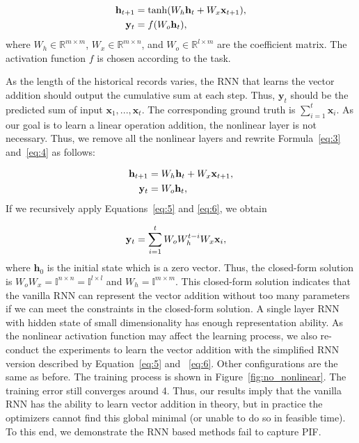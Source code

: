 \documentclass[sigconf]{acmart}
\begin{document}
\begin{align}
\small
\label{eq:3}
\mathbf{h}_{t+1} & = \tanh(W_h\mathbf{h}_t+W_x\mathbf{x}_{t+1}),\\
\label{eq:4}
\mathbf{y}_{t} &= f(W_o\mathbf{h}_t),
\end{align}
where $W_h\in \mathbb{R}^{m\times m}$, $W_x\in \mathbb{R}^{m\times n}$, and $W_o\in \mathbb{R}^{l\times m}$ are the coefficient matrix. The activation function $f$ is  chosen according to the task. 

As the length of the historical records varies, the RNN that learns the  vector addition should  output the cumulative sum at each step. Thus, $\mathbf{y}_t$ should be the predicted sum of input $\mathbf{x}_1, ..., \mathbf{x}_t$. The corresponding ground truth is $\sum\limits_{i=1}^t \mathbf{x}_i$.
As our goal is to learn a linear operation addition, the nonlinear layer is not necessary. Thus, we remove all the nonlinear layers and rewrite Formula~\ref{eq:3} and~\ref{eq:4} as follows:

\begin{align}
\small
\label{eq:5}
\mathbf{h}_{t+1} & = W_h\mathbf{h}_t+W_x\mathbf{x}_{t+1},\\
\label{eq:6}
\mathbf{y}_{t} &= W_o\mathbf{h}_t,
\end{align}
If we recursively apply Equations~\ref{eq:5} and \ref{eq:6}, we obtain  

\begin{align}
\small
\label{eq:7}
\mathbf{y}_{t} &=  \sum\limits_{i=1}^t W_oW_h^{t-i}W_x\mathbf{x}_i,
\end{align}
where $\mathbf{h}_0$ is the initial state which is a zero vector. Thus, the closed-form solution is $W_oW_x=\mathbb{I}^{n\times n}=\mathbb{I}^{l\times l}$ and $W_h=\mathbb{I}^{m\times m}$. This closed-form solution indicates that the vanilla RNN can  represent the vector addition without too many parameters if we can meet the constraints in the closed-form solution. A single layer RNN with  hidden state of small dimensionality has  enough representation ability. As the  nonlinear activation function may affect the learning process, we also  re-conduct the  experiments to learn the vector addition with the simplified RNN version described by Equation~\ref{eq:5} and ~\ref{eq:6}. Other configurations are the same as before. The training process is shown in  Figure~\ref{fig:no_nonlinear}. The training error  still converges around 4.   Thus, our results imply that the vanilla RNN has the ability to learn vector addition in theory,  but in practice the optimizers  cannot find this global minimal (or unable to do so in feasible time). To this end, we demonstrate the RNN based methods fail to capture PIF.  
\end{document}
